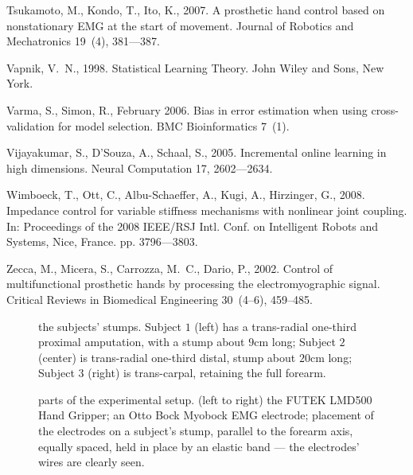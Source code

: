 \documentclass[review,authoryear]{elsarticle}
\begin{document}
\begin{thebibliography}{43}
Tsukamoto, M., Kondo, T., Ito, K., 2007. A prosthetic hand control based on
  nonstationary {EMG} at the start of movement. Journal of Robotics and
  Mechatronics 19~(4), 381---387.

Vapnik, V.~N., 1998. Statistical Learning Theory. John Wiley and Sons, New
  York.

Varma, S., Simon, R., February 2006. Bias in error estimation when using
  cross-validation for model selection. BMC Bioinformatics 7~(1).

Vijayakumar, S., D'Souza, A., Schaal, S., 2005. Incremental online learning in
  high dimensions. Neural Computation 17, 2602---2634.

Wimboeck, T., Ott, C., Albu-Schaeffer, A., Kugi, A., Hirzinger, G., 2008.
  Impedance control for variable stiffness mechanisms with nonlinear joint
  coupling. In: Proceedings of the 2008 IEEE/RSJ Intl. Conf. on Intelligent
  Robots and Systems, Nice, France. pp. 3796---3803.

Zecca, M., Micera, S., Carrozza, M.~C., Dario, P., 2002. Control of
  multifunctional prosthetic hands by processing the electromyographic signal.
  Critical Reviews in Biomedical Engineering 30~(4--6), 459--485.

\end{thebibliography}

\newpage

\begin{figure}
  \caption{the subjects' stumps. Subject $1$ (left) has a trans-radial
    one-third proximal amputation, with a stump about $9$cm long;
    Subject $2$ (center) is trans-radial one-third distal, stump about $20$cm
    long; Subject $3$ (right) is trans-carpal, retaining the full forearm.}
  \label{fig:stumps}
\end{figure}

\begin{figure}
  \caption{parts of the experimental setup. (left to right) the FUTEK LMD500
    Hand Gripper; an Otto Bock Myobock EMG electrode; placement of the electrodes
    on a subject's stump, parallel to the forearm axis, equally spaced, held in
    place by an elastic band --- the electrodes' wires are clearly seen.}
  \label{fig:setup}
\end{figure}
\end{document}
